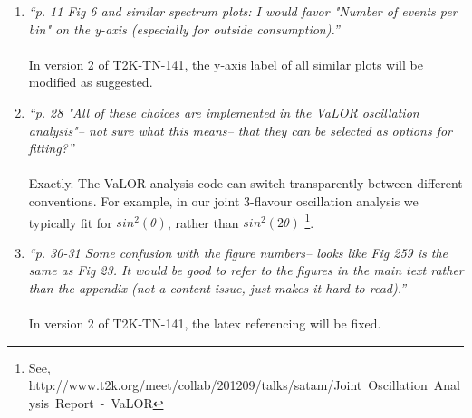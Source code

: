 \begin{enumerate}
\vspace{5 mm}
\item
{\em
  ``p. 11 Fig 6 and similar spectrum plots:  
  I would favor "Number of events per bin" on the y-axis (especially for outside consumption).''
}\\
\\
In version 2 of T2K-TN-141, the y-axis label of all similar plots will be modified
as suggested.

\vspace{5 mm}
\item
{\em
  ``p. 28  "All of these choices are implemented in the VaLOR oscillation analysis"-- 
  not sure what this means-- that they can be selected as options for fitting?''
}\\
\\
Exactly. 
The VaLOR analysis code can switch transparently between different conventions.
For example, in our joint 3-flavour oscillation analysis 
we typically fit for $sin^{2}(\theta)$, rather than $sin^{2}(2\theta)$ 
\footnote{
See, http://www.t2k.org/meet/collab/201209/talks/satam/Joint\ Oscillation\ Analysis\ Report\ -\ VaLOR
}.

\vspace{5 mm}
\item
{\em
  ``p. 30-31 Some confusion with the figure numbers--  looks like  Fig 259 is the same as Fig 23.  
  It would be good to refer to the figures in the main text rather than the appendix
  (not a content issue, just makes it hard to read).''
}\\
\\
In version 2 of T2K-TN-141, the latex referencing will be fixed.


\end{enumerate}
